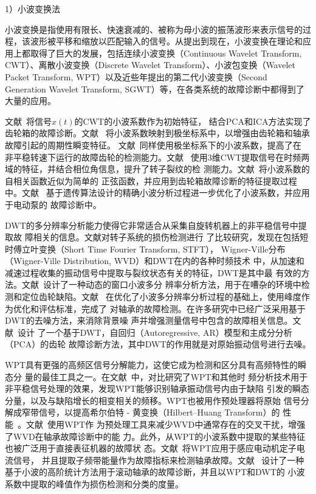 1）小波变换法

小波变换是指使用有限长、快速衰减的、被称为母小波的振荡波形来表示信号的过
程，该波形被平移和缩放以匹配输入的信号。从提出到现在，小波变换在理论和应
用上都取得了巨大的发展，包括连续小波变换（Continuous Wavelet Transform,
CWT）、离散小波变换（Discrete Wavelet Transform）、小波包变换（Wavelet
Packet Transform, WPT）以及近些年提出的第二代小波变换（Second Generation
Wavelet Transform, SGWT）等，在各类系统的故障诊断中都得到了大量的应用。

文献~将信号$x(t)$的CWT的小波系数作为初始特征，
结合PCA和ICA方法实现了齿轮箱的故障诊断。文献~
将小波系数映射到极坐标系中，以增强由齿轮箱和轴承故障引起的周期性瞬变特征。
文献~同样使用极坐标系下的小波系数，提高了在
非平稳转速下运行的故障齿轮的检测能力。文献~
使用3维CWT提取信号在时频两域的特征，并结合相位角信息，提升了转子裂纹的检
测能力。文献~将小波系数的自相关函数近似为简单的
正弦函数，并应用到齿轮箱故障诊断的特征提取过程中。文献~
基于遗传算法设计的精确小波分析过程进一步优化了小波系数，并应用于电动泵的
故障诊断中。

DWT的多分辨率分析能力使得它非常适合从采集自旋转机器上的非平稳信号中提取故
障相关的信息。文献对转子系统的损伤检测进行
了比较研究，发现在包括短时傅立叶变换（Short Time Fourier Transform, STFT），
Wigner-Ville分布（Wigner-Ville Distribution, WVD）和DWT在内的各种时频技术
中，从加速和减速过程收集的振动信号中提取与裂纹状态有关的特征，DWT是其中最
有效的方法。文献~设计了一种动态的窗口小波多分
辨率分析方法，用于在嘈杂的环境中检测和定位齿轮缺陷。文献~
在优化了小波多分辨率分析过程的基础上，使用峰度作为优化和评估标准，完成了
对轴承的故障检测。在许多研究中已经广泛采用基于DWT的去噪方法，来消除背景噪
声并增强测量信号中包含的故障相关信息。文献~设计
了一个基于DWT，自回归（Autoregressive, AR）模型和主成分分析（PCA）的齿轮
故障诊断方法，其中DWT的作用就是对原始振动信号进行去噪。

WPT具有更强的高频区信号分解能力，这使它成为检测和区分具有高频特性的瞬态分
量的最佳工具之一。在文献~中，对比研究了WPT和其他时
频分析技术用于非平稳信号处理的效果，发现WPT能够识别轴承振动信号内由于缺陷
引发的瞬态分量，以及与缺陷增长的相变相关的频移。WPT也被用作预处理器将原始
信号分解成窄带信号，以提高希尔伯特 - 黄变换（Hilbert–Huang Transform）的
性能~\cite{peng2005comparison}。文献~使用WPT作
为预处理工具来减少WVD中通常存在的交叉干扰，增强了WVD在轴承故障诊断中的能
力。此外，从WPT的小波系数中提取的某些特征也被广泛用于直接表征机器的故障状
态。文献~将WPT应用于感应电动机定子电流信号，
并且提取子频带能量作为故障指标来检测轴承故障。文献~
设计了一种基于小波的高阶统计方法用于滚动轴承的故障诊断，并且以WPT和DWT的
小波系数中提取的峰值作为损伤检测和分类的度量。

